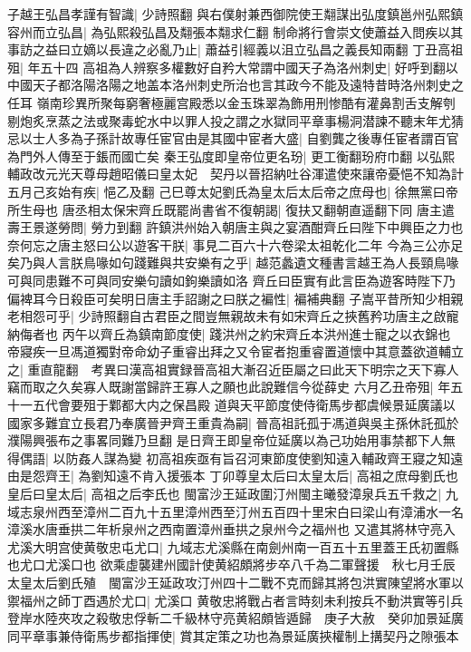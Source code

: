子越王弘昌孝謹有智識|{
	少詩照翻}
與右僕射兼西御院使王翷謀出弘度鎮邕州弘熙鎮容州而立弘昌|{
	為弘熙殺弘昌及翷張本翷求仁翻}
制命將行會崇文使蕭益入問疾以其事訪之益曰立嫡以長違之必亂乃止|{
	蕭益引經義以沮立弘昌之義長知兩翻}
丁丑高祖殂|{
	年五十四}
高祖為人辨察多權數好自矜大常謂中國天子為洛州刺史|{
	好呼到翻以中國天子都洛陽洛陽之地盖本洛州刺史所治也言其政今不能及遠特昔時洛州刺史之任耳}
嶺南珍異所聚每窮奢極麗宫殿悉以金玉珠翠為飾用刑惨酷有灌鼻割舌支解刳剔炮炙烹蒸之法或聚毒蛇水中以罪人投之謂之水獄同平章事楊洞潜諫不聽末年尤猜忌以士人多為子孫計故專任宦官由是其國中宦者大盛|{
	自劉龔之後專任宦者謂百官為門外人傳至于鋹而國亡矣}
秦王弘度即皇帝位更名玢|{
	更工衡翻玢府巾翻}
以弘熙輔政改元光天尊母趙昭儀曰皇太妃　契丹以晉招納吐谷渾遣使來讓帝憂悒不知為計五月己亥始有疾|{
	悒乙及翻}
己巳尊太妃劉氏為皇太后太后帝之庶母也|{
	徐無黨曰帝所生母也}
唐丞相太保宋齊丘既罷尚書省不復朝謁|{
	復扶又翻朝直遥翻下同}
唐主遣壽王景遂勞問|{
	勞力到翻}
許鎮洪州始入朝唐主與之宴酒酣齊丘曰陛下中興臣之力也奈何忘之唐主怒曰公以遊客干朕|{
	事見二百六十六卷梁太祖乾化二年}
今為三公亦足矣乃與人言朕鳥喙如句踐難與共安樂有之乎|{
	越范蠡遺文種書言越王為人長頸鳥喙可與同患難不可與同安樂句讀如鉤樂讀如洛}
齊丘曰臣實有此言臣為遊客時陛下乃偏裨耳今日殺臣可矣明日唐主手詔謝之曰朕之褊性|{
	褊補典翻}
子嵩平昔所知少相親老相怨可乎|{
	少詩照翻自古君臣之間豈無親故未有如宋齊丘之挾舊矜功唐主之啟寵納侮者也}
丙午以齊丘為鎮南節度使|{
	踐洪州之約宋齊丘本洪州進士寵之以衣錦也}
帝寢疾一旦馮道獨對帝命幼子重睿出拜之又令宦者抱重睿置道懷中其意蓋欲道輔立之|{
	重直龍翻　考異曰漢高祖實録晉高祖大漸召近臣屬之曰此天下明宗之天下寡人竊而取之久矣寡人既謝當歸許王寡人之願也此說難信今從薛史}
六月乙丑帝殂|{
	年五十一五代會要殂于鄴都大内之保昌殿}
道與天平節度使侍衛馬步都虞候景延廣議以國家多難宜立長君乃奉廣晉尹齊王重貴為嗣|{
	晉高祖託孤于馮道與吳主孫休託孤於濮陽興張布之事畧同難乃旦翻}
是日齊王即皇帝位延廣以為己功始用事禁都下人無得偶語|{
	以防姦人謀為變}
初高祖疾亟有旨召河東節度使劉知遠入輔政齊王寢之知遠由是怨齊王|{
	為劉知遠不肯入援張本}
丁卯尊皇太后曰太皇太后|{
	高祖之庶母劉氏也}
皇后曰皇太后|{
	高祖之后李氏也}
閩富沙王延政圍汀州閩主曦發漳泉兵五千救之|{
	九域志泉州西至漳州二百九十五里漳州西至汀州五百四十里宋白曰梁山有漳浦水一名漳溪水唐垂拱二年析泉州之西南置漳州垂拱之泉州今之福州也}
又遣其將林守亮入尤溪大明宫使黄敬忠屯尤口|{
	九域志尤溪縣在南劍州南一百五十五里蓋王氏初置縣也尤口尤溪口也}
欲乘虛襲建州國計使黄紹頗將步卒八千為二軍聲援　秋七月壬辰太皇太后劉氏殖　閩富沙王延政攻汀州四十二戰不克而歸其將包洪實陳望將水軍以禦福州之師丁酉遇於尤口|{
	尤溪口}
黄敬忠將戰占者言時刻未利按兵不動洪實等引兵登岸水陸夾攻之殺敬忠俘斬二千級林守亮黄紹頗皆遁歸　庚子大赦　癸卯加景延廣同平章事兼侍衛馬步都指揮使|{
	賞其定策之功也為景延廣挾權制上搆契丹之隙張本}

